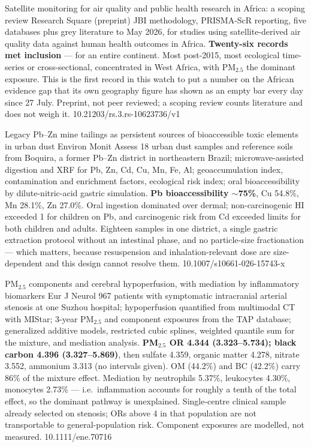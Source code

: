 \documentclass[10pt]{article}
\begin{document}
\clearpage


{Satellite monitoring for air quality and public health research in Africa: a scoping review}
{Research Square (preprint)}
{JBI methodology, PRISMA-ScR reporting, five databases plus grey literature to May 2026,
for studies using satellite-derived air quality data against human health outcomes in
Africa. \textbf{Twenty-six records met inclusion} --- for an entire continent. Most
post-2015, most ecological time-series or cross-sectional, concentrated in West Africa,
with PM$_{2.5}$ the dominant exposure. This is the first record in this watch to put a
number on the African evidence gap that its own geography figure has shown as an empty
bar every day since 27 July. Preprint, not peer reviewed; a scoping review counts
literature and does not weigh it.}
{10.21203/rs.3.rs-10623736/v1}

{Legacy Pb--Zn mine tailings as persistent sources of bioaccessible toxic elements in urban dust}
{Environ Monit Assess}
{18 urban dust samples and reference soils from Boquira, a former Pb--Zn district in
northeastern Brazil; microwave-assisted digestion and XRF for Pb, Zn, Cd, Cu, Mn, Fe, Al;
geoaccumulation index, contamination and enrichment factors, ecological risk index; oral
bioaccessibility by dilute-nitric-acid gastric simulation. \textbf{Pb bioaccessibility
$\sim$75\%}, Cu 54.8\%, Mn 28.1\%, Zn 27.0\%. Oral ingestion dominated over dermal;
non-carcinogenic HI exceeded 1 for children on Pb, and carcinogenic risk from Cd exceeded
limits for both children and adults. Eighteen samples in one district, a single gastric
extraction protocol without an intestinal phase, and no particle-size fractionation ---
which matters, because resuspension and inhalation-relevant dose are size-dependent and
this design cannot resolve them.}
{10.1007/s10661-026-15743-x}


{PM$_{2.5}$ components and cerebral hypoperfusion, with mediation by inflammatory biomarkers}
{Eur J Neurol}
{967 patients with symptomatic intracranial arterial stenosis at one Suzhou hospital;
hypoperfusion quantified from multimodal CT with MIStar; 3-year PM$_{2.5}$ and component
exposures from the TAP database; generalized additive models, restricted cubic splines,
weighted quantile sum for the mixture, and mediation analysis.
\textbf{PM$_{2.5}$ OR 4.344 (3.323--5.734); black carbon 4.396 (3.327--5.869)}, then
sulfate 4.359, organic matter 4.278, nitrate 3.552, ammonium 3.313 (no intervals given).
OM (44.2\%) and BC (42.2\%) carry 86\% of the mixture effect. Mediation by neutrophils
5.37\%, leukocytes 4.30\%, monocytes 2.73\% --- i.e.\ inflammation accounts for roughly a
tenth of the total effect, so the dominant pathway is unexplained. Single-centre clinical
sample already selected on stenosis; ORs above 4 in that population are not transportable
to general-population risk. Component exposures are modelled, not measured.}
{10.1111/ene.70716}
\end{document}
